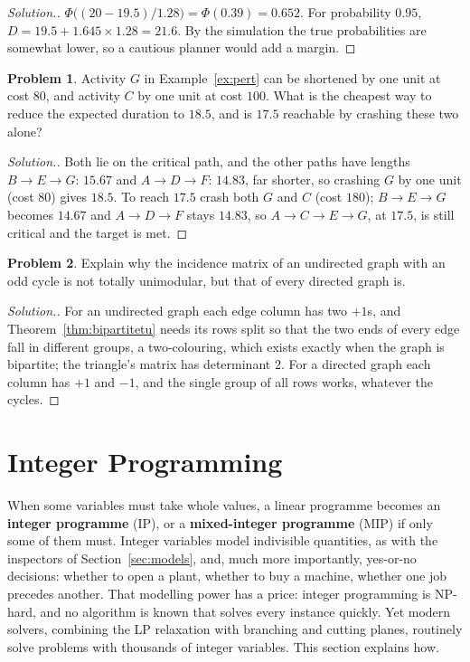 \documentclass[11pt,a4paper]{article}
\numberwithin{equation}{section}
\theoremstyle{definition}
\newtheorem{problemx}{Problem}[subsection]
\newenvironment{problem}{\begin{problemx}}{\end{problemx}}
\newenvironment{solution}
  {\renewcommand{\qedsymbol}{}\begin{proof}[\textit{Solution}.]}
  {\end{proof}}
\begin{document}
\begin{solution}
$\Phi\bigl((20 - 19.5)/1.28\bigr) = \Phi(0.39) = 0.652$. For probability $0.95$, $D = 19.5 + 1.645 \times 1.28 = 21.6$. By the simulation the true probabilities are somewhat lower, so a cautious planner would add a margin.
\end{solution}

\begin{problem}
Activity $G$ in Example~\ref{ex:pert} can be shortened by one unit at cost $80$, and activity $C$ by one unit at cost $100$. What is the cheapest way to reduce the expected duration to $18.5$, and is $17.5$ reachable by crashing these two alone?
\end{problem}

\begin{solution}
Both lie on the critical path, and the other paths have lengths $B \to E \to G$: $15.67$ and $A \to D \to F$: $14.83$, far shorter, so crashing $G$ by one unit (cost $80$) gives $18.5$. To reach $17.5$ crash both $G$ and $C$ (cost $180$); $B \to E \to G$ becomes $14.67$ and $A \to D \to F$ stays $14.83$, so $A \to C \to E \to G$, at $17.5$, is still critical
and the target is met.
\end{solution}

\begin{problem}
Explain why the incidence matrix of an undirected graph with an odd cycle is not totally unimodular, but that of every directed graph is.
\end{problem}

\begin{solution}
For an undirected graph each edge column has two $+1$s, and Theorem~\ref{thm:bipartitetu} needs its rows split so that the two ends of every edge fall in different groups, a two-colouring, which exists exactly when the graph is bipartite; the triangle's matrix has determinant $2$. For a directed graph each column has $+1$ and $-1$, and the single group of all rows works,
whatever the cycles.
\end{solution}

\section{Integer Programming}
\label{sec:integer}

When some variables must take whole values, a linear programme becomes an \textbf{integer programme} (IP), or a \textbf{mixed-integer programme} (MIP) if only some of them must. Integer variables model indivisible quantities, as with the inspectors of Section~\ref{sec:models}, and, much more importantly, yes-or-no decisions: whether to open a
plant, whether to buy a machine, whether one job precedes another. That modelling power has a price: integer programming is NP-hard, and no algorithm is known that solves every instance quickly. Yet modern solvers, combining the LP relaxation with branching and cutting planes, routinely solve problems with thousands of integer variables. This section explains how.
\end{document}
